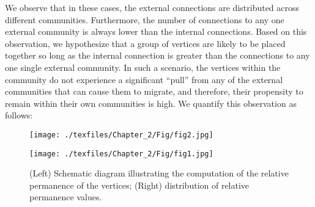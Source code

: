 We observe that in these cases, the external connections are distributed across different communities. Furthermore, the number of
connections to
any one external community is always lower than the internal connections. Based on this observation, we hypothesize that a group of
vertices are likely to be placed together so long as the internal connection is greater than the connections to any one single external
community. In such a scenario, the vertices within the community do not experience a significant ``pull'' from any of the external
communities that  can
cause them to migrate, and therefore, their propensity to remain within their own communities is high. We quantify this observation as
follows:


\begin{figure}[!t]
\begin{minipage}[b]{0.4\linewidth}
\texttt{[image: ./texfiles/Chapter\_2/Fig/fig2.jpg]}
\end{minipage}
\hfill
\begin{minipage}[b]{0.45\linewidth}
 \texttt{[image: ./texfiles/Chapter\_2/Fig/fig1.jpg]}
\end{minipage}
\caption{(Left) Schematic diagram illustrating the computation of the relative permanence of the vertices; (Right) distribution of
relative permanence values.}\label{pull}
\end{figure}



